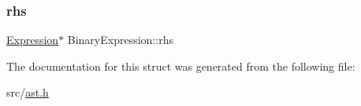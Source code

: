 \mbox{\label{struct_binary_expression_ad569ae3b07f428257b0e7a96746ceb32}} 
\subsubsection{\texorpdfstring{rhs}{rhs}}
{\footnotesize\ttfamily \hyperlink{struct_expression}{Expression}$\ast$ Binary\+Expression\+::rhs}



The documentation for this struct was generated from the following file\+:\begin{DoxyCompactItemize}
\item 
src/\hyperlink{ast_8h}{ast.\+h}\end{DoxyCompactItemize}
